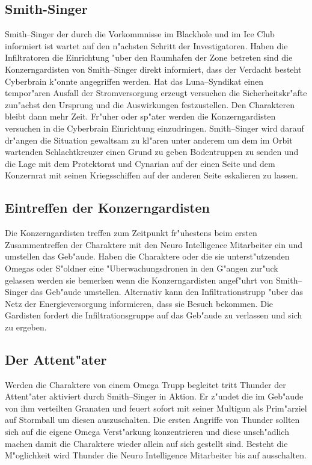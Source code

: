 \subsection{Smith-Singer} 
Smith--Singer der durch die Vorkommnisse im Blackhole und im Ice Club informiert ist wartet auf den n"achsten Schritt der Investigatoren. Haben die Infiltratoren die Einrichtung "uber den Raumhafen der Zone betreten sind die Konzerngardisten von Smith--Singer direkt informiert, dass der Verdacht besteht Cyberbrain k"onnte angegriffen werden. Hat das Luna--Syndikat einen tempor"aren Ausfall der Stromversorgung erzeugt versuchen die Sicherheitskr"afte zun"achst den Ursprung und die Auswirkungen festzustellen. Den Charakteren bleibt dann mehr Zeit. Fr"uher oder sp"ater werden die Konzerngardisten versuchen in die Cyberbrain Einrichtung einzudringen. Smith--Singer wird darauf dr"angen die Situation gewaltsam zu kl"aren unter anderem um dem im Orbit wartenden Schlachtkreuzer einen Grund zu geben Bodentruppen zu senden und die Lage mit dem Protektorat und Cynarian auf der einen Seite und dem Konzernrat mit seinen Kriegsschiffen auf der anderen Seite eskalieren zu lassen. 

\subsection{Eintreffen der Konzerngardisten} 
Die Konzerngardisten treffen zum Zeitpunkt fr"uhestens beim ersten Zusammentreffen der Charaktere mit den Neuro Intelligence Mitarbeiter ein und umstellen das Geb"aude. Haben die Charaktere oder die sie unterst"utzenden Omegas oder S"oldner eine "Uberwachungsdronen in den G"angen zur"uck gelassen werden sie bemerken wenn die Konzerngardisten angef"uhrt von Smith--Singer das Geb"aude umstellen. Alternativ kann \xl{} den Infiltrationstrupp "uber das Netz der Energieversorgung informieren, dass sie Besuch bekommen. Die Gardisten fordert die Infiltrationsgruppe auf das Geb"aude zu verlassen und sich zu ergeben. 

\subsection{Der Attent"ater} 
Werden die Charaktere von einem Omega Trupp begleitet tritt Thunder der Attent"ater aktiviert durch 
Smith--Singer in Aktion. Er z"undet die im Geb"aude von ihm verteilten Granaten und feuert sofort mit seiner Multigun als Prim"arziel auf Stormball um diesen auszuschalten. Die ersten Angriffe von Thunder sollten sich auf die eigene Omega Verst"arkung konzentrieren und diese
unsch"adlich machen damit die Charaktere wieder allein auf sich gestellt sind. Besteht die M"oglichkeit wird Thunder die Neuro Intelligence Mitarbeiter bis auf \ml{} ausschalten.

